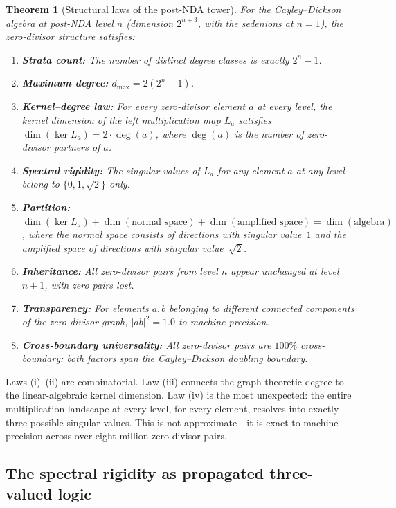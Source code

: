 \documentclass[12pt,a4paper]{article}
\newtheorem{theorem}{Theorem}[section]
\theoremstyle{definition}
\theoremstyle{remark}
\begin{document}
\begin{theorem}[Structural laws of the post-NDA tower]
\label{thm:structural-laws}
For the Cayley--Dickson algebra at post-NDA level $n$ (dimension
$2^{n+3}$, with the sedenions at $n = 1$), the zero-divisor
structure satisfies:
\begin{enumerate}[label=(\roman*), nosep]
  \item \textbf{Strata count:} The number of distinct degree
  classes is exactly $2^n - 1$.
  \item \textbf{Maximum degree:} $d_{\max} = 2(2^n - 1)$.
  \item \textbf{Kernel--degree law:} For every zero-divisor
  element $a$ at every level, the kernel dimension of the left
  multiplication map $L_a$ satisfies $\dim(\ker L_a) = 2 \cdot
  \deg(a)$, where $\deg(a)$ is the number of zero-divisor
  partners of $a$.
  \item \textbf{Spectral rigidity:} The singular values of $L_a$
  for any element $a$ at any level belong to $\{0, 1, \sqrt{2}\}$
  only.
  \item \textbf{Partition:} $\dim(\ker L_a) + \dim(\text{normal
  space}) + \dim(\text{amplified space}) = \dim(\text{algebra})$,
  where the normal space consists of directions with singular
  value~$1$ and the amplified space of directions with singular
  value~$\sqrt{2}$.
  \item \textbf{Inheritance:} All zero-divisor pairs from level
  $n$ appear unchanged at level $n+1$, with zero pairs lost.
  \item \textbf{Transparency:} For elements $a, b$ belonging to
  different connected components of the zero-divisor graph,
  $|ab|^2 = 1.0$ to machine precision.
  \item \textbf{Cross-boundary universality:} All zero-divisor
  pairs are $100\%$ cross-boundary: both factors span the
  Cayley--Dickson doubling boundary.
\end{enumerate}
\end{theorem}

Laws (i)--(ii) are combinatorial. Law (iii) connects the
graph-theoretic degree to the linear-algebraic kernel dimension.
Law (iv) is the most unexpected: the entire multiplication
landscape at every level, for every element, resolves into
exactly three possible singular values. This is not approximate---it
is exact to machine precision across over eight million
zero-divisor pairs.

\subsection{The spectral rigidity as propagated three-valued logic}
\end{document}
